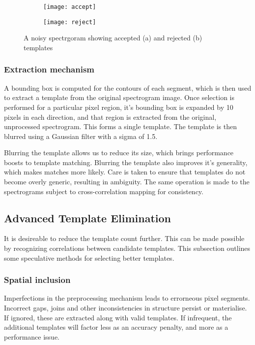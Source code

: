 \begin{figure}[!htb]
  \centering
  \begin{subfigure}[b]{1.0\textwidth}
    \centering
    \texttt{[image: accept]}
    \caption{}
  \end{subfigure}
  \begin{subfigure}[b]{1.0\textwidth}
    \centering
    \texttt{[image: reject]}
    \caption{}
  \end{subfigure}
  \caption{A noisy spectrgoram showing accepted (a) and rejected (b) templates}
  \label{fig:template_select_effects}
\end{figure}

\subsubsection{Extraction mechanism}\label{sec:extract}

A bounding box is computed for the contours of each segment, which is then used
to extract a template from the original spectrogram image.
Once selection is performed for a particular pixel region, it's bounding box is
expanded by 10 pixels in each direction, and that region is extracted from the
original, unprocessed spectrogram.
This forms a single template.
The template is then blurred using a Gaussian filter with a sigma of 1.5.

Blurring the template allows us to reduce its size, which brings performance
boosts to template matching.
Blurring the template also improves it's generality, which makes matches more
likely.
Care is taken to ensure that templates do not become overly generic, resulting
in ambiguity.
The same operation is made to the spectrograms subject to cross-correlation
mapping for consistency.

\subsection{Advanced Template Elimination}
It is desireable to reduce the template count further.
This can be made possible by recognizing correlations between candidate templates.
This subsection outlines some speculative methods for
selecting better templates.

\subsubsection{Spatial inclusion}
Imperfections in the preprocessing mechanism leads to errorneous pixel segments.
Incorrect gaps, joins and other inconsistencies in structure persist or
materialise.
If ignored, these are extracted along with valid templates.
If infrequent, the additional templates will factor less as an accuracy penalty,
and more as a performance issue.

